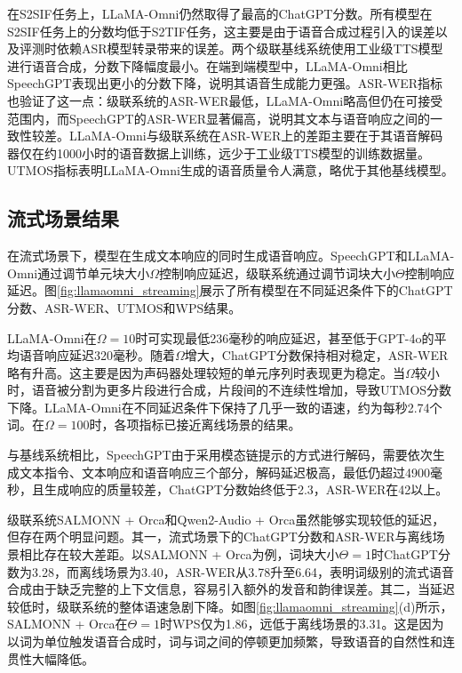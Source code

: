 在S2SIF任务上，LLaMA-Omni仍然取得了最高的ChatGPT分数。所有模型在S2SIF任务上的分数均低于S2TIF任务，这主要是由于语音合成过程引入的误差以及评测时依赖ASR模型转录带来的误差。两个级联基线系统使用工业级TTS模型进行语音合成，分数下降幅度最小。在端到端模型中，LLaMA-Omni相比SpeechGPT表现出更小的分数下降，说明其语音生成能力更强。ASR-WER指标也验证了这一点：级联系统的ASR-WER最低，LLaMA-Omni略高但仍在可接受范围内，而SpeechGPT的ASR-WER显著偏高，说明其文本与语音响应之间的一致性较差。LLaMA-Omni与级联系统在ASR-WER上的差距主要在于其语音解码器仅在约1000小时的语音数据上训练，远少于工业级TTS模型的训练数据量。UTMOS指标表明LLaMA-Omni生成的语音质量令人满意，略优于其他基线模型。

\subsection{流式场景结果}



在流式场景下，模型在生成文本响应的同时生成语音响应。SpeechGPT和LLaMA-Omni通过调节单元块大小$\Omega$控制响应延迟，级联系统通过调节词块大小$\Theta$控制响应延迟。图\ref{fig:llamaomni_streaming}展示了所有模型在不同延迟条件下的ChatGPT分数、ASR-WER、UTMOS和WPS结果。

LLaMA-Omni在$\Omega = 10$时可实现最低236毫秒的响应延迟，甚至低于GPT-4o的平均语音响应延迟320毫秒。随着$\Omega$增大，ChatGPT分数保持相对稳定，ASR-WER略有升高。这主要是因为声码器处理较短的单元序列时表现更为稳定。当$\Omega$较小时，语音被分割为更多片段进行合成，片段间的不连续性增加，导致UTMOS分数下降。LLaMA-Omni在不同延迟条件下保持了几乎一致的语速，约为每秒2.74个词。在$\Omega = 100$时，各项指标已接近离线场景的结果。

与基线系统相比，SpeechGPT由于采用模态链提示的方式进行解码，需要依次生成文本指令、文本响应和语音响应三个部分，解码延迟极高，最低仍超过4900毫秒，且生成响应的质量较差，ChatGPT分数始终低于2.3，ASR-WER在42以上。

级联系统SALMONN + Orca和Qwen2-Audio + Orca虽然能够实现较低的延迟，但存在两个明显问题。其一，流式场景下的ChatGPT分数和ASR-WER与离线场景相比存在较大差距。以SALMONN + Orca为例，词块大小$\Theta = 1$时ChatGPT分数为3.28，而离线场景为3.40，ASR-WER从3.78升至6.64，表明词级别的流式语音合成由于缺乏完整的上下文信息，容易引入额外的发音和韵律误差。其二，当延迟较低时，级联系统的整体语速急剧下降。如图\ref{fig:llamaomni_streaming}(d)所示，SALMONN + Orca在$\Theta = 1$时WPS仅为1.86，远低于离线场景的3.31。这是因为以词为单位触发语音合成时，词与词之间的停顿更加频繁，导致语音的自然性和连贯性大幅降低。

